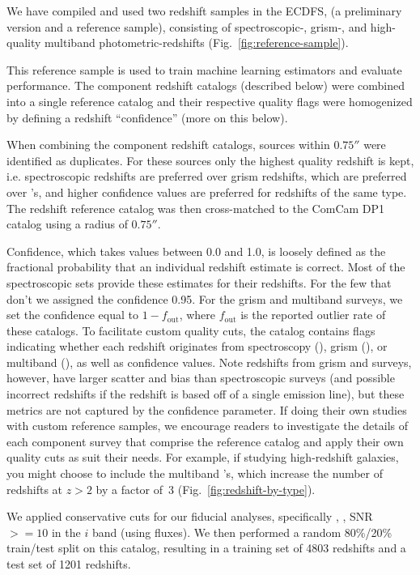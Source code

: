 We have compiled and used two redshift samples in the ECDFS, (a preliminary version and a reference sample), consisting of spectroscopic-, grism-, and high-quality multiband photometric-redshifts (Fig.~\ref{fig:reference-sample}).   

This reference sample is used to train machine learning \photoz estimators and evaluate \photoz performance.
The component redshift catalogs (described below) were combined into a single reference catalog and their respective quality flags were homogenized by defining a redshift ``confidence'' (more on this below).

When combining the component redshift catalogs, sources within $0.75''$ were identified as duplicates.
For these sources only the highest quality redshift is kept, i.e. spectroscopic redshifts are preferred over grism redshifts, which are preferred over \photoz's, and higher confidence values are preferred for redshifts of the same type.
The redshift reference catalog was then cross-matched to the ComCam DP1 catalog using a radius of $0.75''$.

Confidence, which takes values between 0.0 and 1.0, is loosely defined as the fractional probability that an individual redshift estimate is correct.
Most of the spectroscopic sets provide these estimates for their redshifts.
For the few that don't we assigned the confidence 0.95.
For the grism and multiband \photoz surveys, we set the confidence equal to $1 - f_\text{out}$, where $f_\text{out}$ is the reported outlier rate of these catalogs.
To facilitate custom quality cuts, the catalog contains flags indicating whether each redshift originates from spectroscopy (), grism (), or multiband \photoz (), as well as confidence values.
Note redshifts from grism and \photoz surveys, however, have larger scatter and bias than spectroscopic surveys (and possible incorrect redshifts if the redshift is based off of a single emission line), but these metrics are not captured by the confidence parameter.
If doing their own studies with custom reference samples, we encourage readers to investigate the details of each component survey that comprise the reference catalog and apply their own quality cuts as suit their needs.
For example, if studying high-redshift galaxies, you might choose to include the multiband \photoz's, which increase the number of redshifts at $z > 2$ by a factor of~3 (Fig.~\ref{fig:redshift-by-type}).

We applied conservative cuts for our fiducial analyses, specifically , , SNR $>= 10$ in the $i$ band (using  fluxes).
We then performed a random 80\%/20\% train/test split on this catalog, resulting in a training set of 4803 redshifts and a test set of 1201 redshifts.


